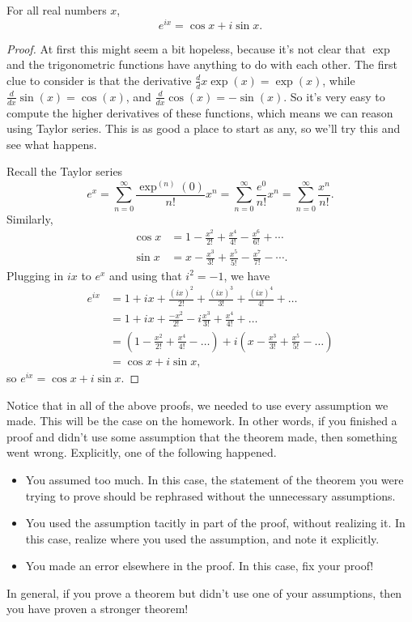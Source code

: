 \documentclass[../main.tex]{subfiles}
\begin{document}
\begin{example}
    For all real numbers $x$,
    \[e^{ix} = \cos x + i \sin x.\]
\end{example}
\begin{proof}
    At first this might seem a bit hopeless, because it's not clear that $\exp$ and the trigonometric functions have anything to do with each other. The first clue to consider is that the derivative $\frac ddx\exp(x) = \exp(x)$, while $\frac d{dx}\sin(x) = \cos(x)$, and $\frac d{dx}\cos(x) = -\sin(x)$. So it's very easy to compute the higher derivatives of these functions, which means we can reason using Taylor series. This is as good a place to start as any, so we'll try this and see what happens.

    Recall the Taylor series
    \[e^x = \sum_{n=0}^\infty \frac{\exp^{(n)}(0)}{n!} x^n = \sum_{n=0}^\infty \frac{e^0}{n!} x^n = \sum_{n=0}^\infty \frac{x^n}{n!}.\]
    Similarly,
    \begin{align*}
        \cos x &= 1 - \frac{x^2}{2!} + \frac{x^4}{4!} - \frac{x^6}{6!} + \cdots \\
        \sin x &= x - \frac{x^3}{3!} + \frac{x^5}{5!} - \frac{x^7}{7!} - \cdots.
    \end{align*}
    Plugging in $ix$ to $e^x$ and using that $i^2 = -1$, we have
    \begin{align*}
        e^{ix} &= 1 + ix + \frac{(ix)^2}{2!} + \frac{(ix)^3}{3!} + \frac{(ix)^4}{4!} + \dots \\
        &= 1 + ix + \frac{-x^2}{2!} - i\frac{x^3}{3!} + \frac{x^4}{4!} + \dots\\
        &= \left(1 - \frac{x^2}{2!} + \frac{x^4}{4!} - \dots\right) + i\left(x - \frac{x^3}{3!} + \frac{x^5}{5!} - \dots\right)\\
        &= \cos x + i\sin x,
    \end{align*}
    so $e^{ix} = \cos x + i\sin x$.
\end{proof}
Notice that in all of the above proofs, we needed to use every assumption we made. This will be the case on the homework. In other words, if you finished a proof and didn't use some assumption that the theorem made, then something went wrong. Explicitly, one of the following happened.
\begin{itemize}
    \item You assumed too much. In this case, the statement of the theorem you were trying to prove should be rephrased without the unnecessary assumptions.
    \item You used the assumption tacitly in part of the proof, without realizing it. In this case, realize where you used the assumption, and note it explicitly.
    \item You made an error elsewhere in the proof. In this case, fix your proof!
\end{itemize}
In general, if you prove a theorem but didn't use one of your assumptions, then you have proven a stronger theorem!
\end{document}
